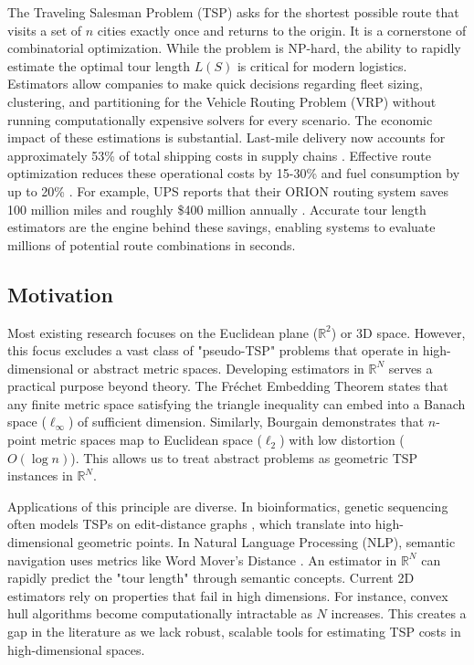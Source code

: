 \documentclass{article}
\begin{document}
The Traveling Salesman Problem (TSP) asks for the shortest possible route that visits a set of $n$ cities exactly once and returns to the origin. It is a cornerstone of combinatorial optimization. While the problem is NP-hard, the ability to rapidly estimate the optimal tour length $L(S)$ is critical for modern logistics. Estimators allow companies to make quick decisions regarding fleet sizing, clustering, and partitioning for the Vehicle Routing Problem (VRP) without running computationally expensive solvers for every scenario\cite{gart2025}. The economic impact of these estimations is substantial. Last-mile delivery now accounts for approximately 53\% of total shipping costs in supply chains \cite{lastmile2023}. Effective route optimization reduces these operational costs by 15-30\% \cite{paragon2025} and fuel consumption by up to 20\% \cite{finmile2024}. For example, UPS reports that their ORION routing system saves 100 million miles and roughly \$400 million annually \cite{upsorion}. Accurate tour length estimators are the engine behind these savings, enabling systems to evaluate millions of potential route combinations in seconds.

\subsection{Motivation}

Most existing research focuses on the Euclidean plane ($\mathbb{R}^2$) or 3D space. However, this focus excludes a vast class of "pseudo-TSP" problems that operate in high-dimensional or abstract metric spaces. Developing estimators in $\mathbb{R}^N$ serves a practical purpose beyond theory. The Fréchet Embedding Theorem \cite{frechet1906} states that any finite metric space satisfying the triangle inequality can embed into a Banach space ($\ell_\infty$) of sufficient dimension. Similarly, Bourgain \cite{bourgain1985} demonstrates that $n$-point metric spaces map to Euclidean space ($\ell_2$) with low distortion ($O(\log n)$). This allows us to treat abstract problems as geometric TSP instances in $\mathbb{R}^N$. 

Applications of this principle are diverse. In bioinformatics, genetic sequencing often models TSPs on edit-distance graphs \cite{agarwala1996}, which translate into high-dimensional geometric points. In Natural Language Processing (NLP), semantic navigation uses metrics like Word Mover's Distance \cite{kusner2015}. An estimator in $\mathbb{R}^N$ can rapidly predict the "tour length" through semantic concepts. Current 2D estimators rely on properties that fail in high dimensions. For instance, convex hull algorithms become computationally intractable as $N$ increases. This creates a gap in the literature as we lack robust, scalable tools for estimating TSP costs in high-dimensional spaces.
\end{document}
